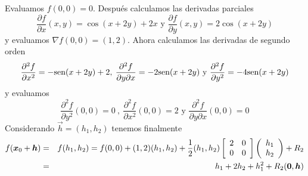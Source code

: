 \begin{solucion}
Evaluamos $f(0,0) = 0$. Despu\'es calculamos las derivadas parciales
$$ 
\frac{\partial f}{\partial x}(x,y) = \cos(x+2y)+2x \text{ y } \frac{\partial f}{\partial y}(x,y) = 2\cos(x+2y)$$
y evaluamos $\nabla f(0,0) = (1,2)$. Ahora calculamos las derivadas de segundo orden
$$
\frac{\partial^2 f}{\partial x^2} = -\sen(x+2y)+2, 
\: \frac{\partial^2 f}{\partial y \partial x} = -2\sen(x+2y)
\text{ y }
\frac{\partial^2 f}{\partial y^2} = -4\sen(x+2y)$$
y evaluamos
$$
\frac{\partial^2 f}{\partial y^2}(0,0) =0 \:,\:
\frac{\partial^2 f}{\partial x^2}(0,0) = 2 \text{ y }
\frac{\partial^2 f}{\partial y \partial x}(0,0) = 0
$$
Considerando 
$\vec{h}=(h_1,h_2)$ tenemos finalmente
\begin{eqnarray*}
f(\vec{x}_0+\vec{h})&=&f(h_1,h_2)=f(0,0)+(1,2)(h_1,h_2)+\frac{1}{2}(h_1,h_2)
\left[
\begin{array}{cc} 
2 & 0 \\
0 & 0 \\
\end{array}\right]
\left(
\begin{array}{c}
h_1 \\
h_2 \\
\end{array}\right) +R_2 \cr
&=& h_1+2h_2+h_1^2+R_2(\vec{0},\vec{h})
\end{eqnarray*}
\end{solucion}

